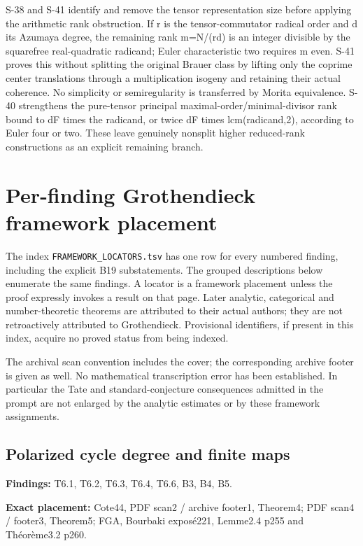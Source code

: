 \documentclass[11pt,a4paper]{article}
\theoremstyle{definition}
\begin{document}
S-38 and S-41 identify and remove the tensor representation size before
applying the arithmetic rank obstruction. If r is the tensor-commutator
radical order and d its Azumaya degree, the remaining rank m=N/(rd) is
an integer divisible by the squarefree real-quadratic radicand; Euler
characteristic two requires m even. S-41 proves this without splitting
the original Brauer class by lifting only the coprime center
translations through a multiplication isogeny and retaining their actual
coherence. No simplicity or semiregularity is transferred by Morita
equivalence. S-40 strengthens the pure-tensor principal
maximal-order/minimal-divisor rank bound to dF times the radicand, or
twice dF times lcm(radicand,2), according to Euler four or two. These
leave genuinely nonsplit higher reduced-rank constructions as an
explicit remaining branch.

\section{Per-finding Grothendieck framework placement}

The index \texttt{FRAMEWORK\_LOCATORS.tsv} has one row for every
numbered finding, including the explicit B19 substatements. The grouped
descriptions below enumerate the same findings. A locator is a framework
placement unless the proof expressly invokes a result on that page.
Later analytic, categorical and number-theoretic theorems are attributed
to their actual authors; they are not retroactively attributed to
Grothendieck. Provisional identifiers, if present in this index, acquire
no proved status from being indexed.

The archival scan convention includes the cover; the corresponding
archive footer is given as well. No mathematical transcription error has
been established. In particular the Tate and standard-conjecture
consequences admitted in the prompt are not enlarged by the analytic
estimates or by these framework assignments.

\subsection{Polarized cycle degree and finite
maps}\label{FRAMEWORK-polarized-cycle-degree-and-finite-maps}

\textbf{Findings:} T6.1, T6.2, T6.3, T6.4, T6.6, B3, B4, B5.

\textbf{Exact placement:} Cote44, PDF scan2 / archive footer1, Theorem4;
PDF scan4 / footer3, Theorem5; FGA, Bourbaki exposé221, Lemme2.4 p255
and Théorème3.2 p260.
\end{document}
